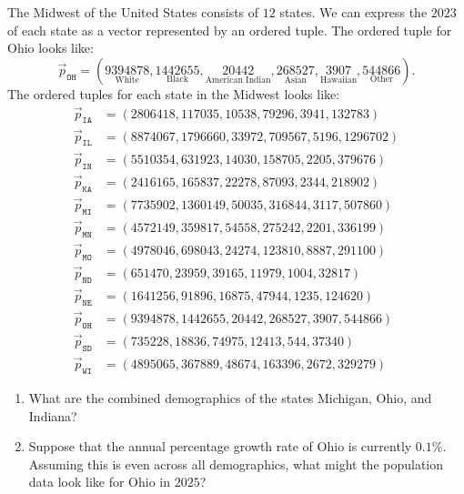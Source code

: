 \documentclass{ximera}
\begin{document}
\begin{example} %
  The Midwest of the United States consists of $12$ states. We can
  express the $2023$
  of each state as a vector represented by an ordered tuple. The
  ordered tuple for Ohio looks like:
  \[
  \vec{p}_{\texttt{OH}} = (\underset{\text{White}}{9394878},\underset{\text{Black}}{1442655},\underset{\text{American Indian}}{20442},\underset{\text{Asian}}{268527},\underset{\text{Hawaiian}}{3907},\underset{\text{Other}}{544866}).
  \]
  The ordered tuples for each state in the Midwest looks like:
\begin{align*}
  \vec{p}_{\texttt{IA}} &= (2806418,117035,10538,79296,3941,132783)\\
  \vec{p}_{\texttt{IL}} &= (8874067,1796660,33972,709567,5196,1296702)\\
  \vec{p}_{\texttt{IN}} &= (5510354,631923,14030,158705,2205,379676)\\
  \vec{p}_{\texttt{KA}} &= (2416165,165837,22278,87093,2344,218902)\\
  \vec{p}_{\texttt{MI}} &= (7735902,1360149,50035,316844,3117,507860)\\
  \vec{p}_{\texttt{MN}} &= (4572149,359817,54558,275242,2201,336199)\\
  \vec{p}_{\texttt{MO}} &= (4978046,698043,24274,123810,8887,291100)\\
  \vec{p}_{\texttt{ND}} &= (651470,23959,39165,11979,1004,32817)\\
  \vec{p}_{\texttt{NE}} &= (1641256,91896,16875,47944,1235,124620)\\
  \vec{p}_{\texttt{OH}} &= (9394878,1442655,20442,268527,3907,544866)\\
  \vec{p}_{\texttt{SD}} &= (735228,18836,74975,12413,544,37340)\\
  \vec{p}_{\texttt{WI}} &= (4895065,367889,48674,163396,2672,329279)
\end{align*}
\begin{enumerate}
\item What are the combined demographics of the states Michigan, Ohio,
  and Indiana?
\item Suppose that the annual percentage growth rate of Ohio is
  currently $0.1\%$. Assuming this is even across all demographics,
  what might the population data look like for Ohio in $2025$?
\end{enumerate}
\begin{explanation}

\end{explanation}
\end{example}
\end{document}
